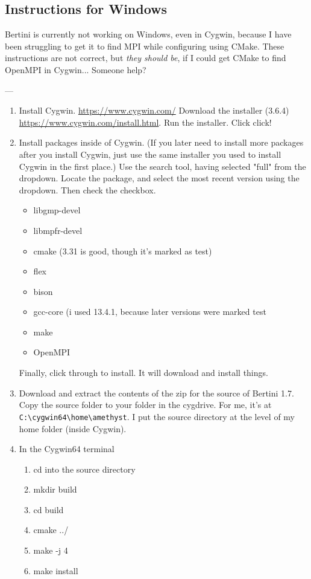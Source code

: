 
\subsection{Instructions for Windows}


Bertini is currently not working on Windows, even in Cygwin, because I have been struggling to get it to find MPI while configuring using CMake.   These instructions are not correct, but {\em they should be}, if I could get CMake to find OpenMPI in Cygwin...  Someone help?

---

\begin{enumerate}

\item Install Cygwin.  \url{https://www.cygwin.com/}  Download the installer (3.6.4)  \url{https://www.cygwin.com/install.html}. Run the installer. Click click!

\item Install packages inside of Cygwin.  (If you later need to install more packages after you install Cygwin, just use the same installer you used to install Cygwin in the first place.)
Use the search tool, having selected "full" from the dropdown.  Locate the package, and select the most recent version using the dropdown.  Then check the checkbox.

\begin{itemize}
\item libgmp-devel
\item libmpfr-devel
\item cmake (3.31 is good, though it's marked as test)
\item flex
\item bison
\item gcc-core (i used 13.4.1, because later versions were marked test
\item make 
\item OpenMPI
\end{itemize}

Finally, click through to install.  It will download and install things.

\item Download and extract the contents of the zip for the source of Bertini 1.7.  Copy the source folder to your folder in the cygdrive.  For me, it's at \verb|C:\cygwin64\home\amethyst|.  I put the source directory at the level of my home folder (inside Cygwin).

\item In the Cygwin64 terminal

\begin{enumerate}
   \item cd into the source directory
   \item mkdir build
   \item cd build
   \item cmake ../ 
   \item make -j 4
   \item make install
\end{enumerate}

\end{enumerate}







